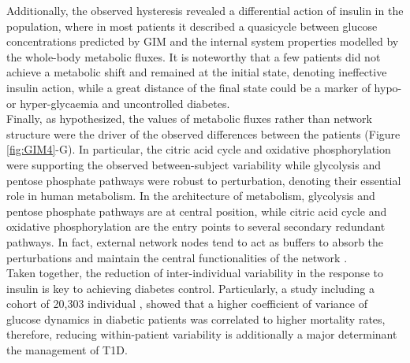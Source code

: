 Additionally, the observed hysteresis revealed a differential action of insulin in the population, where in most patients it described a quasicycle between glucose concentrations predicted by GIM and the internal system properties modelled by the whole-body metabolic fluxes. It is noteworthy that a few patients did not achieve a metabolic shift and remained at the initial state, denoting ineffective insulin action, while a great distance of the final state could be a marker of hypo- or hyper-glycaemia and uncontrolled diabetes. \\
Finally, as hypothesized, the values of metabolic fluxes rather than network structure were the driver of the observed differences between the patients (Figure \ref{fig:GIM4}-G). In particular, the citric acid cycle and oxidative phosphorylation were supporting the observed between-subject variability while glycolysis and pentose phosphate pathways were robust to perturbation, denoting their essential role in human metabolism. In the architecture of metabolism, glycolysis and pentose phosphate pathways are at central position, while citric acid cycle and oxidative phosphorylation are the entry points to several secondary redundant pathways. In fact, external network nodes tend to act as buffers to absorb the perturbations and maintain the central functionalities of the network \cite{gilarranz2017effects}.\\
Taken together, the reduction of inter-individual variability in the response to insulin  is key to achieving diabetes control. Particularly, a study including a cohort of 20,303 individual \cite{akirov2017high}, showed that a higher coefficient of variance of glucose dynamics in diabetic patients was correlated to higher mortality rates, therefore, reducing within-patient variability is additionally a major determinant the management of T1D.
